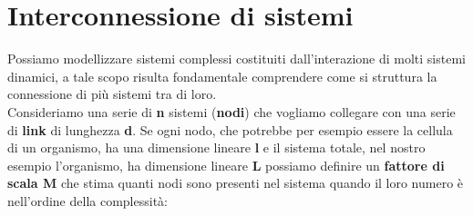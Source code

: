 \section{Interconnessione di sistemi}

Possiamo modellizzare sistemi complessi costituiti dall'interazione di molti sistemi dinamici, a tale scopo risulta fondamentale comprendere come si struttura la connessione di più sistemi tra di loro.\\

Consideriamo una serie di \textbf{n} sistemi (\textbf{nodi}) che vogliamo collegare con una serie di \textbf{link} di lunghezza \textbf{d}. Se ogni nodo, che potrebbe per esempio essere la cellula di un organismo, ha una dimensione lineare \textbf{l} e il sistema totale, nel nostro esempio l'organismo, ha dimensione lineare \textbf{L} possiamo definire un \textbf{fattore di scala M} che stima quanti nodi sono presenti nel sistema quando il loro numero è nell'ordine della complessità:
